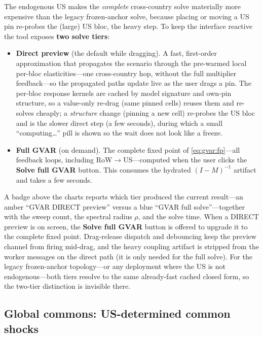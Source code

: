 \documentclass[11pt]{article}
\theoremstyle{definition}
\theoremstyle{remark}
\begin{document}
The endogenous US makes the \emph{complete} cross-country solve materially more
expensive than the legacy frozen-anchor solve, because placing or moving a US
pin re-probes the (large) US bloc, the heavy step. To keep the interface
reactive the tool exposes \textbf{two solve tiers}:
\begin{itemize}
  \item \textbf{Direct preview} (the default while dragging). A fast,
    first-order approximation that propagates the scenario through the
    pre-warmed local per-bloc elasticities---one cross-country hop, without the
    full multiplier feedback---so the propagated paths update live as the user
    drags a pin. The per-bloc response kernels are cached by model signature and
    own-pin structure, so a value-only re-drag (same pinned cells) reuses them
    and re-solves cheaply; a \emph{structure} change (pinning a new cell) re-probes
    the US bloc and is the slower direct step (a few seconds), during which a
    small ``computing\ldots'' pill is shown so the wait does not look like a
    freeze.
  \item \textbf{Full GVAR} (on demand). The complete fixed point of
    \eqref{eq:gvar:fp}---all feedback loops, including RoW$\to$US---computed when
    the user clicks the \textbf{Solve full GVAR} button. This consumes the
    hydrated $(I-M)^{-1}$ artifact and takes a few seconds.
\end{itemize}
A badge above the charts reports which tier produced the current result---an
amber ``GVAR DIRECT preview'' versus a blue ``GVAR full solve''---together with
the sweep count, the spectral radius $\rho$, and the solve time. When a DIRECT
preview is on screen, the \textbf{Solve full GVAR} button is offered to upgrade
it to the complete fixed point. Drag-release dispatch and debouncing keep the
preview channel from firing mid-drag, and the heavy coupling artifact is stripped
from the worker messages on the direct path (it is only needed for the full
solve). For the legacy frozen-anchor topology---or any deployment where the US is
not endogenous---both tiers resolve to the same already-fast cached closed form,
so the two-tier distinction is invisible there.

\subsection{Global commons: US-determined common shocks}\label{sec:gvar:commons}
\end{document}
